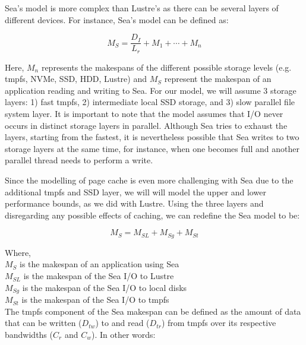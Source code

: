 \documentclass[10pt,journal,compsoc]{IEEEtran}
\begin{document}
      Sea's model is more complex than Lustre's as there can be several layers
      of different devices. For instance, Sea's model can be defined as:

      \begin{equation}\label{eq:sea-comp:sea}
          M_{S} = \frac{D_{I}}{L_{r}} + M_{1} + \cdots + M_{n}
      \end{equation}

      Here, $M_{n}$ represents the makespans of the different possible storage
      levels (e.g. tmpfs, NVMe, SSD, HDD, Lustre) and $M_{S}$ represent the
      makespan of an application reading and writing to Sea. For our model, we
      will assume 3 storage layers: 1) fast tmpfs, 2) intermediate local SSD
      storage, and 3) slow parallel file system layer. It is important to note that
      the model assumes that I/O never occurs in distinct storage layers in parallel.
      Although Sea tries to exhaust the layers, starting from the fastest, it is nevertheless
      possible that Sea writes to two storage layers at the same time, for instance, when one becomes full
      and another parallel thread needs to perform a write.

      Since the modelling of page cache is even more challenging with Sea due to
      the additional tmpfs and SSD layer, we will will model the upper and lower
      performance bounds, as we did with Lustre. Using the three layers and
      disregarding any possible effects of caching, we can redefine the Sea
      model to be:

      \begin{equation}\label{eq:sea-comp:snc}
          M_{S} = M_{SL} + M_{Sg} + M_{St}
      \end{equation}

      Where, \\
      $M_{S}$ is the makespan of an application using Sea \\
      $M_{SL}$ is the makespan of the Sea I/O to Lustre \\
      $M_{Sg}$ is the makespan of the Sea I/O to local disks \\
      $M_{St}$ is the makespan of the Sea I/O to tmpfs \\



      The tmpfs component of the Sea makespan can be defined as the amount of
      data that can be written ($D_{tw}$) to and read ($D_{tr}$) from tmpfs over
      its respective bandwidths ($C_{r}$ and $C_{w}$). In other words:
\end{document}
